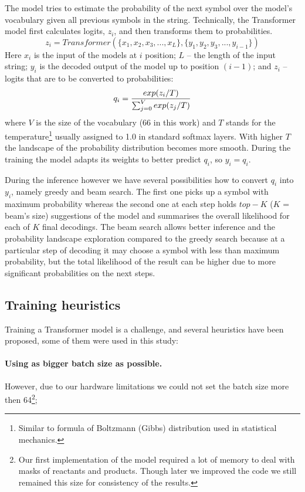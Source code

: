 \documentclass{article}
\begin{document}
The model tries to estimate the probability of the next symbol over the model's vocabulary given all previous symbols in the string. Technically, the Transformer model first calculates logits, $z_i$, and then transforms them to probabilities. 
\begin{equation}
z_i = Transformer( \{x_1, x_2, x_3, ..., x_L\}, \{y_1, y_2, y_3, ..., y_{i-1} \})
\end{equation}
Here $x_i$ is the input of the models at $i$ position; $L$ -- the length of the input string; $y_i$ is the decoded output of the model up to position $(i-1)$; and $z_i$ -- logits that are to be converted to probabilities:
\begin{equation}
\label{eq:t}
q_i = {{exp(z_i /T) }\over {\sum_{j=0}^{V} exp(z_j /T) }}
\end{equation}
where $V$ is the size of the vocabulary (66 in this work) and $T$ stands for the temperature\footnote{Similar to formula of Boltzmann (Gibbs) distribution used in statistical mechanics.} usually assigned to 1.0 in standard softmax layers. With higher $T$ the landscape of the probability distribution becomes more smooth. During the training the model adapts its weights to better predict $q_i$, so $y_i = q_i$. 

During the inference however we have several possibilities how to convert $q_i$ into $y_i$, namely greedy and beam search. The first one picks up a symbol with maximum probability whereas the second one at each step holds $top-K$ ($K$ = beam's size) suggestions of the model and summarises the overall likelihood for each of $K$ final decodings. The beam search allows better inference and the probability landscape exploration compared to the greedy search because at a particular step of decoding it may choose a symbol with less than maximum probability, but the total likelihood of the result can be higher due to more significant probabilities on the next steps.

\subsection{Training heuristics}
Training a Transformer model is a challenge, and several heuristics have been proposed\cite{TransformerTips}, some of them were used in this study:

\paragraph{Using as bigger batch size as possible.} However, due to our hardware limitations we could not set the batch size more then 64\footnote{Our first implementation of the model required a lot of memory to deal with masks of reactants and products. Though later we improved the code we still remained this size for consistency of the results.};
\end{document}
